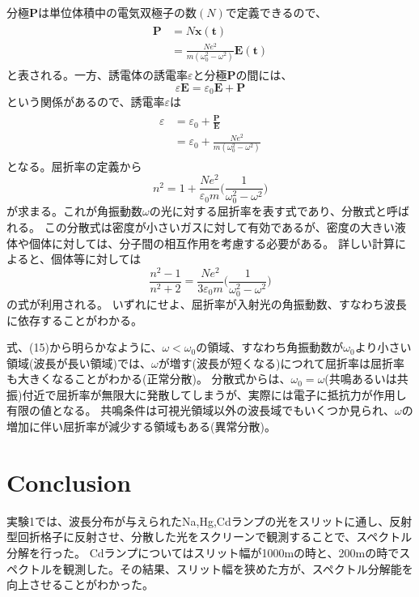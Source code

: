 \documentclass[a4paper,10pt]{jsarticle}
\begin{document}
\begin{multicols}{2}
分極$\bm{P}$は単位体積中の電気双極子の数$(N)$で定義できるので、
\begin{align}
  \begin{split}
  \bm{P} &= N\bm{x(t)} \\
         &= \frac{Ne^2}{m(\omega_0^2 - \omega^2)}\bm{E(t)}
  \end{split}
\end{align}
と表される。一方、誘電体の誘電率$\varepsilon$と分極$\bm{P}$の間には、
\begin{equation}
  \varepsilon\bm{E} = \varepsilon_0\bm{E} + \bm{P}
\end{equation}
という関係があるので、誘電率$\varepsilon$は
\begin{align}
  \begin{split}
  \varepsilon &= \varepsilon_0 + \frac{\bm{P}}{\bm{E}} \\
              &= \varepsilon_0 + \frac{Ne^2}{m(\omega_0^2 - \omega^2)}
  \end{split}
\end{align}
となる。屈折率の定義から
\begin{equation}
  n^2 = 1 + \frac{Ne^2}{\varepsilon_0 m}\bigg(\frac{1}{\omega_0^2 - \omega^2}\bigg)
\end{equation}
が求まる。これが角振動数$\omega$の光に対する屈折率を表す式であり、分散式と呼ばれる。
\clearpage
この分散式は密度が小さいガスに対して有効であるが、密度の大きい液体や個体に対しては、分子間の相互作用を考慮する必要がある。
詳しい計算によると、個体等に対しては
\begin{equation}
  \frac{n^2-1}{n^2+2} = \frac{Ne^2}{3\varepsilon_0 m}\bigg(\frac{1}{\omega_0^2 - \omega^2}\bigg)
\end{equation}
の式が利用される。
いずれにせよ、屈折率が入射光の角振動数、すなわち波長に依存することがわかる。

式、(15)から明らかなように、$\omega < \omega_0$の領域、すなわち角振動数が$\omega_0$より小さい領域(波長が長い領域)では、$\omega$が増す(波長が短くなる)につれて屈折率は屈折率も大きくなることがわかる(正常分散)。
分散式からは、$\omega_0 = \omega$(共鳴あるいは共振)付近で屈折率が無限大に発散してしまうが、実際には電子に抵抗力が作用し有限の値となる。
共鳴条件は可視光領域以外の波長域でもいくつか見られ、$\omega$の増加に伴い屈折率が減少する領域もある(異常分散)。

\section{Conclusion}
実験1では、波長分布が与えられたNa,Hg,Cdランプの光をスリットに通し、反射型回折格子に反射させ、分散した光をスクリーンで観測することで、スペクトル分解を行った。
  Cdランプについてはスリット幅が1000\textmu mの時と、200\textmu mの時でスペクトルを観測した。その結果、スリット幅を狭めた方が、スペクトル分解能を向上させることがわかった。


\end{multicols}
\end{document}
